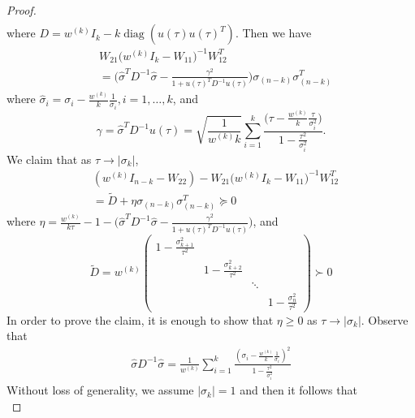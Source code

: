 \documentclass[11pt]{amsart}
\theoremstyle{plain}
\theoremstyle{definition}
\theoremstyle{remark}
\DeclareMathOperator{\diag}{diag}
\begin{document}
\begin{appendices}
\begin{proof}
\begin{equation}
\begin{split}
				\end{split}
			\end{equation}
			where $D=w^{(k)}I_k - k\diag(u(\tau)u(\tau)^T)$. Then we have
			\begin{equation}
				\begin{split}
					&W_{21}\Big(w^{(k)} I_k - W_{11}\Big)^{-1}W_{12}^T \\
					&=\Big( \hat\sigma^TD^{-1}\hat\sigma- \frac{\gamma^2}{1 + u(\tau)^TD^{-1}u(\tau)}\Big)\sigma_{(n-k)}\sigma_{(n-k)}^T
				\end{split}
			\end{equation}
			where $\hat \sigma_i = \sigma_i - \frac{w^{(k)}}{k}\frac{1}{\sigma_i}, i=1,\dots,k$, and  
			\[
			\gamma = \hat\sigma^TD^{-1}u(\tau) = \sqrt{\frac{1}{w^{(k)}k}}\sum_{i=1}^k\frac{\big(\tau - \frac{w^{(k)}}{k}\frac{\tau}{\sigma_i^2}\big)}{1 - \frac{\tau^2}{\sigma_i^2}}.
			\]
			  We claim that  
			as $\tau \rightarrow |\sigma_k|$, 
			\begin{equation}\label{eq:psd_condition}
				\begin{split}
					&(w^{(k)} I_{n-k}- W_{22}) - W_{21}\Big(w^{(k)} I_k - W_{11}\Big)^{-1}W_{12}^T\\
					&= \tilde D + \eta\sigma_{(n-k)}\sigma_{(n-k)}^T \succeq 0
				\end{split}
			\end{equation}
			where $\eta = \frac{w^{(k)}}{k\tau}-1-\big( \hat\sigma^TD^{-1}\hat\sigma- \frac{\gamma^2}{1 + u(\tau)^TD^{-1}u(\tau)}\big)$, and
			\[
			\tilde D = w^{(k)}\begin{pmatrix}
				1 - \frac{\sigma_{k+1}^2}{\tau^2} & & &\\
				&1 - \frac{\sigma_{k+2}^2}{\tau^2}& & \\
				&&\ddots&\\
				&&&1 - \frac{\sigma_{n}^2}{\tau^2}
			\end{pmatrix}\succ 0
			\]
			In order to prove the claim, it is enough to show that $\eta\geq0$ as $\tau \rightarrow |\sigma_k|$. Observe that
			\begin{equation}
				\begin{split}
					\hat\sigma D^{-1}\hat\sigma = \frac{1}{w^{(k)}} \sum_{i=1}^k\frac{(\sigma_i - \frac{w^{(k)}}{k}\frac{1}{\sigma_i})^2}{1 - \frac{\tau^2}{\sigma_i^2}}
				\end{split}
			\end{equation}
			Without loss of generality, we assume $|\sigma_k|=1$ and then it follows that
			\begin{equation}

\end{equation}
\end{proof}
\end{appendices}
\end{document}
